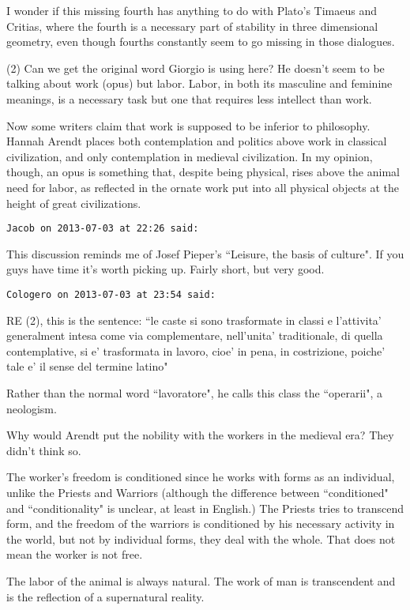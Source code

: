 \begin{footnotesize}
\begin{sffamily}
I wonder if this missing fourth has anything to do with Plato's Timaeus and Critias, where the fourth is a necessary part of stability in three dimensional geometry, even though fourths constantly seem to go missing in those dialogues.

(2) Can we get the original word Giorgio is using here? He doesn't seem to be talking about work (opus) but labor. Labor, in both its masculine and feminine meanings, is a necessary task but one that requires less intellect than work.

Now some writers claim that work is supposed to be inferior to philosophy. Hannah Arendt places both contemplation and politics above work in classical civilization, and only contemplation in medieval civilization. In my opinion, though, an opus is something that, despite being physical, rises above the animal need for labor, as reflected in the ornate work put into all physical objects at the height of great civilizations.


\hfill

\texttt{Jacob on 2013-07-03 at 22:26 said: }

This discussion reminds me of Josef Pieper's ``Leisure, the basis of culture". If you guys have time it's worth picking up. Fairly short, but very good.


\hfill

\texttt{Cologero on 2013-07-03 at 23:54 said: }

RE (2), this is the sentence: ``le caste si sono trasformate in classi e l'attivita' generalment intesa come via complementare, nell'unita' traditionale, di quella contemplative, si e' trasformata in lavoro, cioe' in pena, in costrizione, poiche' tale e' il sense del termine latino"

Rather than the normal word ``lavoratore", he calls this class the ``operarii", a neologism.

Why would Arendt put the nobility with the workers in the medieval era? They didn't think so.

The worker's freedom is conditioned since he works with forms as an individual, unlike the Priests and Warriors (although the difference between ``conditioned" and ``conditionality" is unclear, at least in English.) The Priests tries to transcend form, and the freedom of the warriors is conditioned by his necessary activity in the world, but not by individual forms, they deal with the whole. That does not mean the worker is not free.

The labor of the animal is always natural. The work of man is transcendent and is the reflection of a supernatural reality.



\end{sffamily}
\end{footnotesize}
